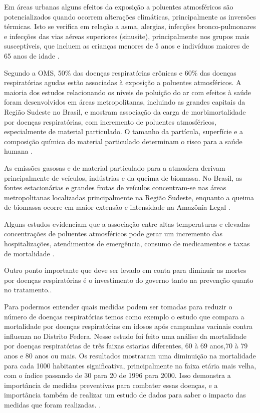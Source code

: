 \documentclass[journal]{IEEEtran}
\begin{document}
Em áreas urbanas alguns efeitos da exposição a poluentes  atmosféricos  são  potencializados  quando  ocorrem alterações  climáticas,  principalmente  as  inversões  térmicas.  Isto  se  verifica  em  relação  a  asma,  alergias,  infecções bronco-pulmonares e infecções das vias aéreas superiores  (sinusite),  principalmente  nos  grupos  mais susceptíveis, que incluem as crianças menores de 5 anos e indivíduos maiores de 65 anos de idade \cite{mudanças}.

Segundo a OMS, 50\% das doenças respiratórias crônicas e 60\% das doenças respiratórias agudas estão associadas à exposição a poluentes atmosféricos. A maioria dos estudos relacionando os níveis de poluição do ar com efeitos à saúde foram desenvolvidos em áreas metropolitanas, incluindo  as  grandes  capitais  da  Região  Sudeste  no  Brasil,  e mostram associação da carga de morbimortalidade por doenças  respiratórias,  com  incremento  de  poluentes atmosféricos,  especialmente  de  material  particulado. O tamanho da partícula, superfície e a composição química do material particulado determinam o risco para a saúde humana \cite{mudanças}.

As emissões gasosas e de material particulado para a atmosfera derivam principalmente de veículos, indústrias e da queima de biomassa. No Brasil, as fontes estacionárias  e  grandes  frotas  de  veículos  concentram-se nas áreas metropolitanas localizadas principalmente na Região Sudeste, enquanto a queima de biomassa ocorre em maior extensão e intensidade na Amazônia Legal \cite{mudanças}.

Alguns estudos evidenciam que a associação entre altas temperaturas e elevadas concentrações de poluentes  atmosféricos  pode  gerar  um  incremento  das  hospitalizações,  atendimentos  de  emergência,  consumo de medicamentos e taxas de mortalidade \cite{mudanças}.

Outro ponto importante que deve ser levado em conta para diminuir as mortes por doenças respiratórias é o investimento do governo tanto na prevenção quanto no tratamento.\cite{campanha_vacinais}.

Para podermos entender quais medidas podem ser tomadas para reduzir o número de doenças respiratórias temos como exemplo o estudo que compara a mortalidade por doenças respiratórias em idosos após campanhas vacinais contra influenza no Distrito Federa. Nesse estudo foi feito uma análise da mortalidade por doenças respiratórias de três faixas estarias diferentes, 60 à 69 anos,70 à 79 anos e 80 anos ou mais. Os resultados mostraram uma diminuição na mortalidade para cada 1000 habitantes significativa, principalmente na faixa etária mais velha, com o índice passando de 30 para 20 de 1996 para 2000. Isso demonstra a importância de medidas preventivas para combater essas doenças, e a importância também de realizar um estudo de dados para saber o impacto das medidas que foram realizadas.     \cite{campanha_vacinais}.
\end{document}

